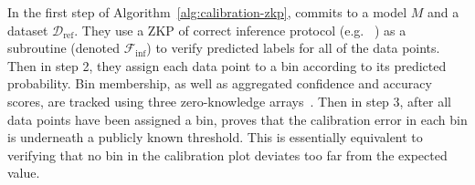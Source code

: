 

In the first step of Algorithm~\ref{alg:calibration-zkp}, \prover commits to a model $M$ and a dataset $\mathcal{D}_{\text{ref}}$. They use a ZKP of correct inference protocol (e.g. ~\cite{weng2021mystique,sun2024zkllm}) as a subroutine (denoted $\mathcal{F}_{\text{inf}}$) to verify predicted labels for all of the data points. Then in step 2, they assign each data point to a bin according to its predicted probability. Bin membership, as well as aggregated confidence and accuracy scores, are tracked using three zero-knowledge arrays~\cite{franzese2021zkram}. Then in step 3, after all data points have been assigned a bin, \prover proves that the calibration error in each bin is underneath a publicly known threshold. This is essentially equivalent to verifying that no bin in the calibration plot deviates too far from the expected value.  

